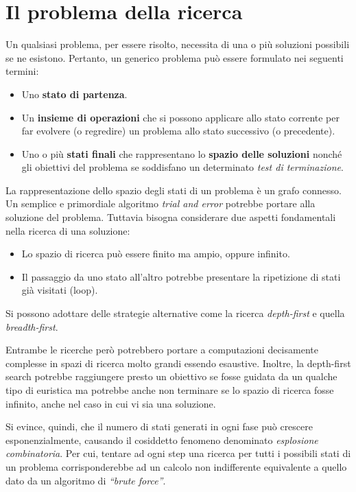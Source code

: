 \section{Il problema della ricerca}
Un qualsiasi problema, per essere risolto, necessita di una o più soluzioni possibili se ne esistono. Pertanto, un generico problema può essere formulato nei seguenti termini:
\begin{itemize}
  \item Uno \textbf{stato di partenza}.
  \item Un \textbf{insieme di operazioni} che si possono applicare allo stato corrente per far evolvere (o regredire) un problema allo stato successivo (o precedente).
  \item Uno o più \textbf{stati finali} che rappresentano lo \textbf{spazio delle soluzioni} nonché gli obiettivi del problema se soddisfano un determinato \emph{test di terminazione}.
\end{itemize}

La rappresentazione dello spazio degli stati di un problema è un grafo connesso. Un semplice e primordiale algoritmo \emph{trial and error} potrebbe portare alla soluzione del problema. Tuttavia bisogna considerare due aspetti fondamentali nella ricerca di una soluzione:
\begin{itemize}
  \item Lo spazio di ricerca può essere finito ma ampio, oppure infinito.
  \item Il passaggio da uno stato all'altro potrebbe presentare la ripetizione di stati già visitati (loop).
\end{itemize}

Si possono adottare delle strategie alternative come la ricerca \emph{depth-first} e quella \emph{breadth-first}.

Entrambe le ricerche però potrebbero portare a computazioni decisamente complesse in spazi di ricerca molto grandi essendo esaustive. Inoltre, la depth-first search potrebbe raggiungere presto un obiettivo se fosse guidata da un qualche tipo di euristica ma potrebbe anche non terminare se lo spazio di ricerca fosse infinito, anche nel caso in cui vi sia una soluzione.

Si evince, quindi, che il numero di stati generati in ogni fase può crescere esponenzialmente, causando il cosiddetto fenomeno denominato \emph{esplosione combinatoria}. Per cui, tentare ad ogni step una ricerca per tutti i possibili stati di un problema corrisponderebbe ad un calcolo non indifferente equivalente a quello dato da un algoritmo di \emph{``brute force''}.

